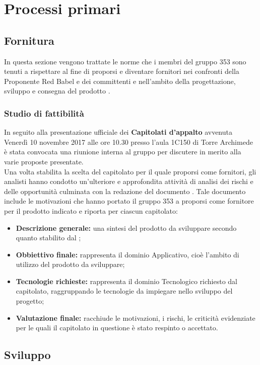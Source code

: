 \documentclass[NormeDiProgetto.tex]{subfiles}
\begin{document}
\chapter{Processi primari}
\section{Fornitura}
In questa sezione vengono trattate le norme che i membri del gruppo 353 sono tenuti a rispettare al fine di proporsi e diventare fornitori nei confronti della Proponente Red Babel e dei committenti \Vardanega e \Cardin nell'ambito della progettazione, sviluppo e consegna del prodotto \progetto.

\subsection{Studio di fattibilità}
In seguito alla presentazione ufficiale dei \textbf{Capitolati d'appalto} avvenuta Venerdì 10 novembre 2017 alle ore 10.30 presso l'aula 1C150 di Torre Archimede è stata convocata una riunione interna al gruppo per discutere in merito alla varie proposte presentate.\\
Una volta stabilita la scelta del capitolato per il quale proporsi come fornitori, gli analisti hanno condotto un'ulteriore e approfondita attività di analisi dei rischi e delle opportunità culminata con la redazione del documento \sdf \vruno. Tale documento include le motivazioni che hanno portato il gruppo 353 a proporsi come fornitore per il prodotto indicato e riporta per ciascun capitolato:
\begin{itemize}
	\item \textbf{Descrizione generale:} una sintesi del prodotto da sviluppare secondo quanto stabilito dal ;
	\item \textbf{Obbiettivo finale:} rappresenta il dominio Applicativo, cioè l'ambito di utilizzo del prodotto da sviluppare;
	\item \textbf{Tecnologie richieste:} rappresenta il dominio Tecnologico richiesto dal capitolato, raggruppando le tecnologie da impiegare nello sviluppo del progetto;
	\item \textbf{Valutazione finale:} racchiude le motivazioni, i rischi, le criticità evidenziate per le quali il capitolato in questione è stato respinto o accettato.
\end{itemize}

\section{Sviluppo}
\end{document}

